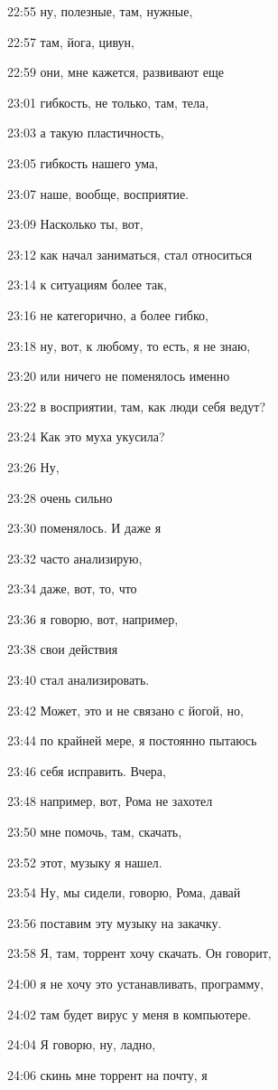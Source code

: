 22:55
ну, полезные, там, нужные,

22:57
там, йога, цивун,

22:59
они, мне кажется, развивают еще

23:01
гибкость, не только, там, тела,

23:03
а такую пластичность,

23:05
гибкость нашего ума,

23:07
наше, вообще, восприятие.

23:09
Насколько ты, вот,

23:12
как начал заниматься, стал относиться

23:14
к ситуациям более так,

23:16
не категорично, а более гибко,

23:18
ну, вот, к любому, то есть, я не знаю,

23:20
или ничего не поменялось именно

23:22
в восприятии, там, как люди себя ведут?

23:24
Как это муха укусила?

23:26
Ну,

23:28
очень сильно

23:30
поменялось. И даже я

23:32
часто анализирую,

23:34
даже, вот, то, что

23:36
я говорю, вот, например,

23:38
свои действия

23:40
стал анализировать.

23:42
Может, это и не связано с йогой, но,

23:44
по крайней мере, я постоянно пытаюсь

23:46
себя исправить. Вчера,

23:48
например, вот, Рома не захотел

23:50
мне помочь, там, скачать,

23:52
этот, музыку я нашел.

23:54
Ну, мы сидели, говорю, Рома, давай

23:56
поставим эту музыку на закачку.

23:58
Я, там, торрент хочу скачать. Он говорит,

24:00
я не хочу это устанавливать, программу,

24:02
там будет вирус у меня в компьютере.

24:04
Я говорю, ну, ладно,

24:06
скинь мне торрент на почту, я

